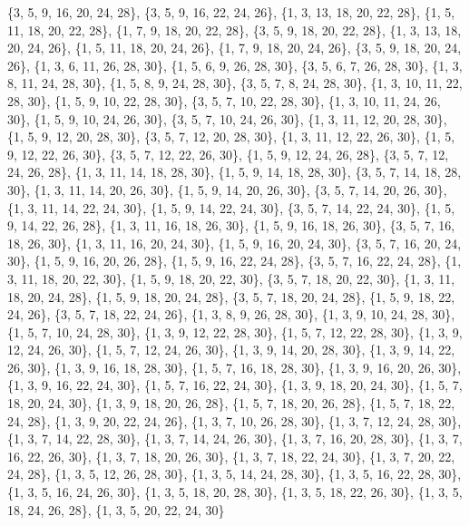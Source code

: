 \documentclass[11pt,a4paper]{article}
\begin{document}
{\{3, 5, 9, 16, 20, 24, 28\}, \{3, 5, 9, 16, 22, 24, 26\}, \{1, 3, 13, 18, 20, 22, 28\}, \{1, 5, 11, 18, 20, 22, 28\}, \{1, 7, 9, 18, 20, 22, 28\},
\{3, 5, 9, 18, 20, 22, 28\}, \{1, 3, 13, 18, 20, 24, 26\}, \{1, 5, 11, 18, 20, 24, 26\}, \{1, 7, 9, 18, 20, 24, 26\}, \{3, 5, 9, 18, 20, 24, 26\},
\{1, 3, 6, 11, 26, 28, 30\}, \{1, 5, 6, 9, 26, 28, 30\}, \{3, 5, 6, 7, 26, 28, 30\}, \{1, 3, 8, 11, 24, 28, 30\}, \{1, 5, 8, 9, 24, 28, 30\},
\{3, 5, 7, 8, 24, 28, 30\}, \{1, 3, 10, 11, 22, 28, 30\}, \{1, 5, 9, 10, 22, 28, 30\}, \{3, 5, 7, 10, 22, 28, 30\}, \{1, 3, 10, 11, 24, 26, 30\},
\{1, 5, 9, 10, 24, 26, 30\}, \{3, 5, 7, 10, 24, 26, 30\}, \{1, 3, 11, 12, 20, 28, 30\}, \{1, 5, 9, 12, 20, 28, 30\}, \{3, 5, 7, 12, 20, 28, 30\},
\{1, 3, 11, 12, 22, 26, 30\}, \{1, 5, 9, 12, 22, 26, 30\}, \{3, 5, 7, 12, 22, 26, 30\}, \{1, 5, 9, 12, 24, 26, 28\}, \{3, 5, 7, 12, 24, 26, 28\},
\{1, 3, 11, 14, 18, 28, 30\}, \{1, 5, 9, 14, 18, 28, 30\}, \{3, 5, 7, 14, 18, 28, 30\}, \{1, 3, 11, 14, 20, 26, 30\}, \{1, 5, 9, 14, 20, 26, 30\},
\{3, 5, 7, 14, 20, 26, 30\}, \{1, 3, 11, 14, 22, 24, 30\}, \{1, 5, 9, 14, 22, 24, 30\}, \{3, 5, 7, 14, 22, 24, 30\}, \{1, 5, 9, 14, 22, 26, 28\},
\{1, 3, 11, 16, 18, 26, 30\}, \{1, 5, 9, 16, 18, 26, 30\}, \{3, 5, 7, 16, 18, 26, 30\}, \{1, 3, 11, 16, 20, 24, 30\}, \{1, 5, 9, 16, 20, 24, 30\},
\{3, 5, 7, 16, 20, 24, 30\}, \{1, 5, 9, 16, 20, 26, 28\}, \{1, 5, 9, 16, 22, 24, 28\}, \{3, 5, 7, 16, 22, 24, 28\}, \{1, 3, 11, 18, 20, 22, 30\},
\{1, 5, 9, 18, 20, 22, 30\}, \{3, 5, 7, 18, 20, 22, 30\}, \{1, 3, 11, 18, 20, 24, 28\}, \{1, 5, 9, 18, 20, 24, 28\}, \{3, 5, 7, 18, 20, 24, 28\},
\{1, 5, 9, 18, 22, 24, 26\}, \{3, 5, 7, 18, 22, 24, 26\}, \{1, 3, 8, 9, 26, 28, 30\}, \{1, 3, 9, 10, 24, 28, 30\}, \{1, 5, 7, 10, 24, 28, 30\},
\{1, 3, 9, 12, 22, 28, 30\}, \{1, 5, 7, 12, 22, 28, 30\}, \{1, 3, 9, 12, 24, 26, 30\}, \{1, 5, 7, 12, 24, 26, 30\}, \{1, 3, 9, 14, 20, 28, 30\},
\{1, 3, 9, 14, 22, 26, 30\}, \{1, 3, 9, 16, 18, 28, 30\}, \{1, 5, 7, 16, 18, 28, 30\}, \{1, 3, 9, 16, 20, 26, 30\}, \{1, 3, 9, 16, 22, 24, 30\},
\{1, 5, 7, 16, 22, 24, 30\}, \{1, 3, 9, 18, 20, 24, 30\}, \{1, 5, 7, 18, 20, 24, 30\}, \{1, 3, 9, 18, 20, 26, 28\}, \{1, 5, 7, 18, 20, 26, 28\},
\{1, 5, 7, 18, 22, 24, 28\}, \{1, 3, 9, 20, 22, 24, 26\}, \{1, 3, 7, 10, 26, 28, 30\}, \{1, 3, 7, 12, 24, 28, 30\}, \{1, 3, 7, 14, 22, 28, 30\},
\{1, 3, 7, 14, 24, 26, 30\}, \{1, 3, 7, 16, 20, 28, 30\}, \{1, 3, 7, 16, 22, 26, 30\}, \{1, 3, 7, 18, 20, 26, 30\}, \{1, 3, 7, 18, 22, 24, 30\},
\{1, 3, 7, 20, 22, 24, 28\}, \{1, 3, 5, 12, 26, 28, 30\}, \{1, 3, 5, 14, 24, 28, 30\}, \{1, 3, 5, 16, 22, 28, 30\}, \{1, 3, 5, 16, 24, 26, 30\},
\{1, 3, 5, 18, 20, 28, 30\}, \{1, 3, 5, 18, 22, 26, 30\}, \{1, 3, 5, 18, 24, 26, 28\}, \{1, 3, 5, 20, 22, 24, 30\}}
\end{document}
